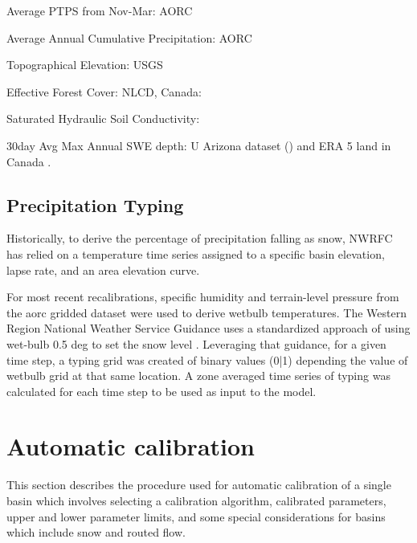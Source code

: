\documentclass{agujournal2019}
\begin{document}
Average PTPS from Nov-Mar:  AORC \cite{Fall_2023}

Average Annual Cumulative Precipitation: AORC \cite{Fall_2023}

Topographical Elevation:  USGS \cite{usgs2023}

Effective Forest Cover:  NLCD, Canada:  \cite{Beaudoin_2014}

Saturated Hydraulic Soil Conductivity:  \cite{Zhang_2018}

30day Avg Max Annual SWE depth:  U Arizona dataset (\cite{Zeng_2018,Broxton2019}) and ERA 5 land in Canada \cite{Mu_oz_Sabater_2021,CCCS2019}.

\subsection{Precipitation Typing}

Historically, to derive the percentage of precipitation falling as snow, NWRFC has relied on a temperature time series assigned to a specific basin elevation, lapse rate, and an area elevation curve. 

For most recent recalibrations, specific humidity and terrain-level pressure from the aorc gridded dataset were used to derive wetbulb temperatures. The Western Region National Weather Service Guidance uses a standardized approach of using wet-bulb 0.5 deg to set the snow level \cite{Cleave2019}. Leveraging that guidance, for a given time step,  a typing grid was created of binary values (0|1) depending the value of wetbulb grid at that same location. A zone averaged time series of typing was calculated for each time step to be used as input to the model. 

\section{Automatic calibration}

This section describes the procedure used for automatic calibration of a single basin which involves selecting a calibration algorithm, calibrated parameters, upper and lower parameter limits, and some special considerations for basins which include snow and routed flow. 

\end{document}
